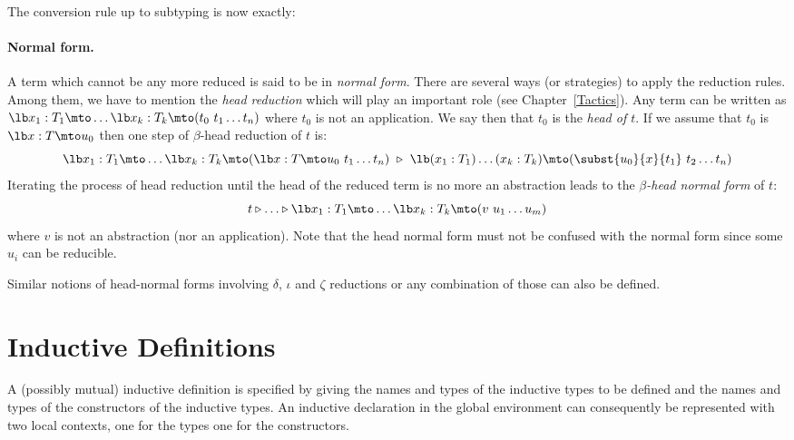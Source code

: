 The conversion rule up to subtyping is now exactly:

\begin{description}\label{Conv}
\item[Conv]
  \end{description}


\paragraph[Normal form.]{Normal form.\label{Normal-form}\label{Head-normal-form}}
A term which cannot be any more reduced is said to be in {\em normal
  form}. There are several ways (or strategies) to apply the reduction
rules. Among them, we have to mention the {\em head reduction} which
will play an important role (see Chapter~\ref{Tactics}). Any term can
be written as $\lb x_1:T_1\mto \ldots \lb x_k:T_k \mto
(t_0\ t_1\ldots t_n)$ where
$t_0$ is not an application. We say then that $t_0$ is the {\em head
  of $t$}. If we assume that $t_0$ is $\lb x:T\mto u_0$ then one step of
$\beta$-head reduction of $t$ is:
\[\lb x_1:T_1\mto \ldots \lb x_k:T_k\mto (\lb x:T\mto u_0\ t_1\ldots t_n)
~\triangleright ~ \lb (x_1:T_1)\ldots(x_k:T_k)\mto
(\subst{u_0}{x}{t_1}\ t_2 \ldots t_n)\]
Iterating the process of head reduction until the head of the reduced
term is no more an abstraction leads to the {\em $\beta$-head normal
  form} of $t$:
\[ t \triangleright \ldots \triangleright
\lb x_1:T_1\mto \ldots\lb x_k:T_k\mto (v\ u_1
\ldots u_m)\]
where $v$ is not an abstraction (nor an application).  Note that the
head normal form must not be confused with the normal form since some
$u_i$ can be reducible.

Similar notions of head-normal forms involving $\delta$, $\iota$ and $\zeta$
reductions or any combination of those can also be defined.

\section[Inductive Definitions]{Inductive Definitions\label{Cic-inductive-definitions}}

A (possibly mutual) inductive definition is specified by giving the
names and types of the inductive types to be
defined and the names and types of the constructors of the inductive types.
An inductive declaration in the global environment can
consequently be represented with two local contexts, one for the types
one for the constructors.

